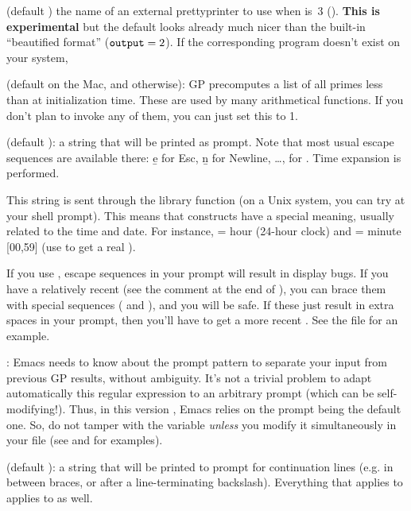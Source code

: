  (default ) the name of an external prettyprinter to use when
 is~3 (). {\bf This is
experimental} but the default  looks already much nicer than
the built-in ``beautified format'' (${\tt output} = 2$). If the
corresponding program doesn't exist on your system,

 (default  on the Mac, and 
otherwise): GP precomputes a list of all primes less than 
at initialization time. These are used by many arithmetical functions. If
you don't plan to invoke any of them, you can just set this to 1.

 (default ): a string that will be printed as
prompt. Note that most usual escape sequences are available there: \b{e} for
Esc, \b{n} for Newline, \dots, \kbd{\bs\bs} for \kbd{\bs}. Time expansion is
performed.

This string is sent through the library function  (on a
Unix system, you can try  at your shell prompt). This means
that \kbd{\%} constructs have a special meaning, usually related to the time
and date. For instance,  = hour (24-hour clock) and  =
minute [00,59] (use \kbd{\%\%} to get a real \kbd{\%}).

If you use , escape sequences in your prompt will result in
display bugs. If you have a relatively recent  (see the comment
at the end of ), you can brace them with special sequences
(\kbd{\bs[} and \kbd{\bs]}), and you will be safe. If these just result in
extra spaces in your prompt, then you'll have to get a more recent
. See the file  for an example.

: Emacs needs to know about the prompt pattern to
separate your input from previous GP results, without ambiguity. It's not a
trivial problem to adapt automatically this regular expression to an
arbitrary prompt (which can be self-modifying!). Thus, in this version \vers,
Emacs relies on the prompt being the default one. So, do not tamper with the
 variable \emph{unless} you modify it simultaneously in your
 file (see  and  for
examples).

 (default ): a string that will be printed
to prompt for continuation lines (e.g. in between braces, or after a
line-terminating backslash). Everything that applies to 
applies to  as well.

